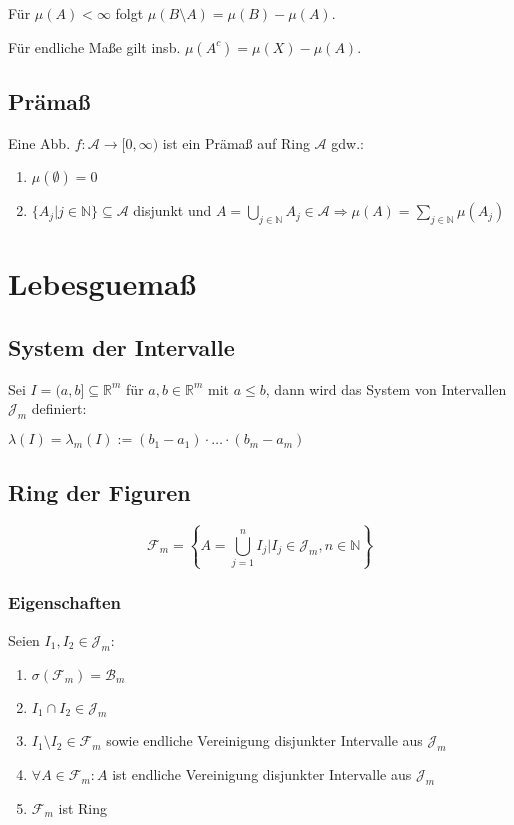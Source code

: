Für $\mu(A) < \infty$ folgt $\mu(B\setminus A) = \mu(B) - \mu(A)$.

Für endliche Maße gilt insb. $\mu(A^c) = \mu(X) - \mu(A)$.

\subsection*{Prämaß}

Eine Abb. $f : \mathcal{A} \rightarrow [0, \infty)$ ist ein Prämaß auf Ring $\mathcal{A}$ gdw.:

\begin{enumerate}[label=(\alph*)]
	\item $\mu(\emptyset) = 0$
	\item $\{A_j | j \in \mathbb{N}\} \subseteq \mathcal{A}$ disjunkt und $A = \bigcup_{j\in \mathbb{N}} A_j \in \mathcal{A} \Rightarrow \mu(A) = \sum_{j\in \mathbb{N}} \mu(A_j)$
\end{enumerate}

\section*{Lebesguemaß}

\subsection*{System der Intervalle}

Sei $I = (a, b] \subseteq \mathbb{R}^m$ für $a, b \in \mathbb{R}^m$ mit $a \leq b$, dann wird das System von Intervallen $\mathcal{J}_m$ definiert:

$\lambda(I) = \lambda_m(I) := (b_1 - a_1) \cdot \hdots \cdot (b_m - a_m)$

\subsection*{Ring der Figuren}

$$\mathcal{F}_m = \left\{ A = \bigcup_{j=1}^n I_j | I_j \in \mathcal{J}_m, n \in \mathbb{N} \right\}$$

\subsubsection*{Eigenschaften}

Seien $I_1, I_2 \in \mathcal{J}_m$:

\begin{enumerate}[label=(\alph*)]
	\item $\sigma(\mathcal{F}_m) = \mathcal{B}_m$
	\item $I_1 \cap I_2 \in \mathcal{J}_m$
	\item $I_1 \setminus I_2 \in \mathcal{F}_m$ sowie endliche Vereinigung disjunkter Intervalle aus $\mathcal{J}_m$
	\item $\forall A \in \mathcal{F}_m: A$ ist endliche Vereinigung disjunkter Intervalle aus $\mathcal{J}_m$
	\item $\mathcal{F}_m$ ist Ring
\end{enumerate}

